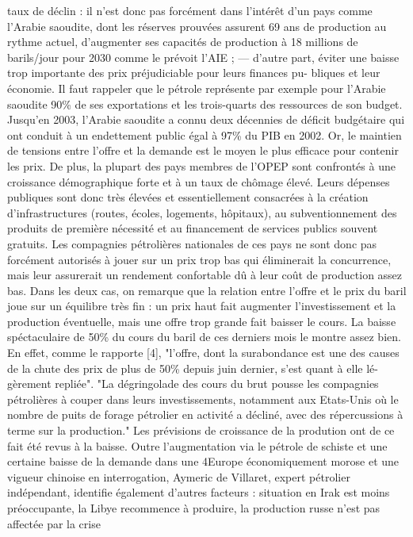 taux de déclin : il n’est donc pas forcément dans l’intérêt d’un pays comme l’Arabie saoudite,
dont les réserves prouvées assurent 69 ans de production au rythme actuel, d’augmenter ses
capacités de production à 18 millions de barils/jour pour 2030 comme le prévoit l’AIE ;
— d’autre part, éviter une baisse trop importante des prix préjudiciable pour leurs finances pu-
bliques et leur économie. Il faut rappeler que le pétrole représente par exemple pour l’Arabie
saoudite 90\% de ses exportations et les trois-quarts des ressources de son budget. Jusqu’en
2003, l’Arabie saoudite a connu deux décennies de déficit budgétaire qui ont conduit à un
endettement public égal à 97\% du PIB en 2002. Or, le maintien de tensions entre l’offre et
la demande est le moyen le plus efficace pour contenir les prix. De plus, la plupart des pays
membres de l’OPEP sont confrontés à une croissance démographique forte et à un taux de
chômage élevé. Leurs dépenses publiques sont donc très élevées et essentiellement consacrées
à la création d’infrastructures (routes, écoles, logements, hôpitaux), au subventionnement
des produits de première nécessité et au financement de services publics souvent gratuits.
Les compagnies pétrolières nationales de ces pays ne sont donc pas forcément autorisés à
jouer sur un prix trop bas qui éliminerait la concurrence, mais leur assurerait un rendement
confortable dû à leur coût de production assez bas.
Dans les deux cas, on remarque que la relation entre l’offre et le prix du baril joue sur un
équilibre très fin : un prix haut fait augmenter l’investissement et la production éventuelle, mais
une offre trop grande fait baisser le cours. La baisse spéctaculaire de 50\% du cours du baril de ces
derniers mois le montre assez bien. En effet, comme le rapporte [4], "l’offre, dont la surabondance
est une des causes de la chute des prix de plus de 50\% depuis juin dernier, s’est quant à elle lé-
gèrement repliée". "La dégringolade des cours du brut pousse les compagnies pétrolières à couper
dans leurs investissements, notamment aux Etats-Unis où le nombre de puits de forage pétrolier en
activité a décliné, avec des répercussions à terme sur la production." Les prévisions de croissance
de la prodution ont de ce fait été revus à la baisse.
Outre l’augmentation via le pétrole de schiste et une certaine baisse de la demande dans une
4Europe économiquement morose et une vigueur chinoise en interrogation, Aymeric de Villaret,
expert pétrolier indépendant, identifie également d’autres facteurs : situation en Irak est moins
préoccupante, la Libye recommence à produire, la production russe n’est pas affectée par la crise
